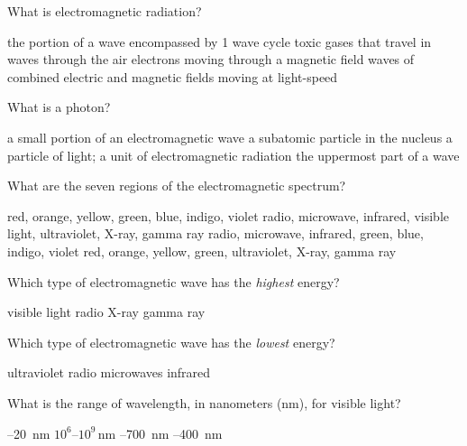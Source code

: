 \documentclass[addpoints]{exam}
\begin{document}
\begin{questions}
\begin{oneparchoices}
\end{oneparchoices}

\question
What is electromagnetic radiation?

\begin{choices}
    \choice the portion of a wave encompassed by 1 wave cycle
    \choice toxic gases that travel in waves through the air
    \choice electrons moving through a magnetic field
    \correctchoice waves of combined electric and magnetic fields moving at light-speed
\end{choices}

\question
What is a photon?

\begin{choices}
    \choice a small portion of an electromagnetic wave
    \choice a subatomic particle in the nucleus 
    \correctchoice a particle of light; a unit of electromagnetic radiation
    \choice the uppermost part of a wave
\end{choices}

\question
What are the seven regions of the electromagnetic spectrum?

\begin{choices}
    \choice red, orange, yellow, green, blue, indigo, violet
    \correctchoice radio, microwave, infrared, visible light, ultraviolet, X-ray, gamma ray
    \choice radio, microwave, infrared, green, blue, indigo, violet
    \choice red, orange, yellow, green, ultraviolet, X-ray, gamma ray
\end{choices}

\question
Which type of electromagnetic wave has the \textit{highest} energy?

\begin{choices}
    \choice visible light
    \choice radio
    \choice X-ray
    \correctchoice gamma ray
\end{choices}

\question
Which type of electromagnetic wave has the \textit{lowest} energy?

\begin{choices}
    \choice ultraviolet
    \correctchoice radio
    \choice microwaves
    \choice infrared
\end{choices}

\question
What is the range of wavelength, in nanometers (nm), for visible light?

\begin{choices}
    --\SI{20}{nm}
    \choice $10^6$--$10^9\,$nm
    --\SI{700}{nm}
    --\SI{400}{nm}
\end{choices}


\end{questions}
\end{document}
